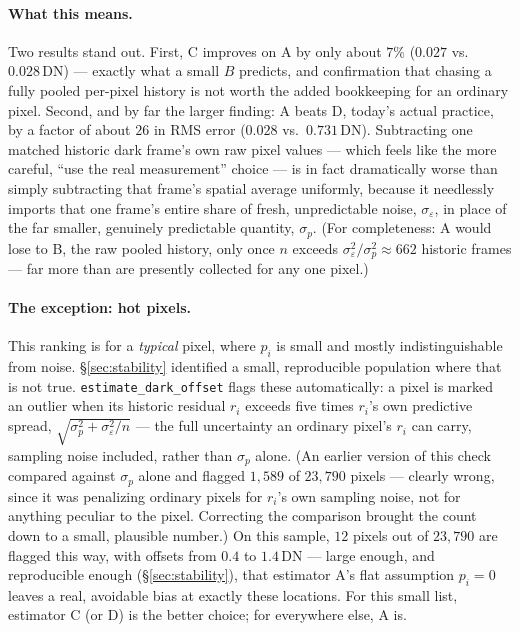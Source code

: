 \documentclass[11pt,a4paper]{article}
\newcommand{\code}[1]{\texttt{#1}}
\begin{document}
\paragraph{What this means.}
Two results stand out. First, C improves on A by only about $7\%$
($0.027$ vs.\ $0.028\,\mathrm{DN}$) --- exactly what a small $B$ predicts,
and confirmation that chasing a fully pooled per-pixel history is not worth
the added bookkeeping for an ordinary pixel. Second, and by far the larger
finding: A beats D, today's actual practice, by a factor of about
$26$ in RMS error ($0.028$ vs.\ $0.731\,\mathrm{DN}$). Subtracting one
matched historic dark frame's own raw pixel values --- which feels like the
more careful, ``use the real measurement'' choice --- is in fact
dramatically worse than simply subtracting that frame's spatial average
uniformly, because it needlessly imports that one frame's entire share of
fresh, unpredictable noise, $\sigma_\varepsilon$, in place of the far
smaller, genuinely predictable quantity, $\sigma_p$. (For completeness: A
would lose to B, the raw pooled history, only once $n$ exceeds
$\sigma_\varepsilon^2/\sigma_p^2 \approx 662$ historic frames --- far more
than are presently collected for any one pixel.)

\paragraph{The exception: hot pixels.}
This ranking is for a \emph{typical} pixel, where $p_i$ is small and mostly
indistinguishable from noise. \S\ref{sec:stability} identified a small,
reproducible population where that is not true.
\code{estimate\_dark\_offset} flags these automatically: a pixel is marked
an outlier when its historic residual $r_i$ exceeds five times $r_i$'s own
predictive spread, $\sqrt{\sigma_p^2 + \sigma_\varepsilon^2/n}$ --- the full
uncertainty an ordinary pixel's $r_i$ can carry, sampling noise included,
rather than $\sigma_p$ alone. (An earlier version of this check compared
against $\sigma_p$ alone and flagged $1{,}589$ of $23{,}790$ pixels ---
clearly wrong, since it was penalizing ordinary pixels for $r_i$'s own
sampling noise, not for anything peculiar to the pixel. Correcting the
comparison brought the count down to a small, plausible number.) On this
sample, $12$ pixels out of $23{,}790$ are flagged this way, with offsets
from $0.4$ to $1.4\,\mathrm{DN}$ --- large enough, and reproducible enough
(\S\ref{sec:stability}), that estimator A's flat assumption $p_i = 0$
leaves a real, avoidable bias at exactly these locations. For this small
list, estimator C (or D) is the better choice; for everywhere else, A is.
\end{document}
